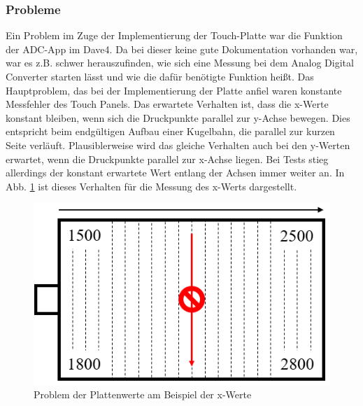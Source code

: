 \documentclass[12pt,a4paper,bibliography=totoc,listof=totoc]{scrartcl}
\begin{document}
\subsubsection{Probleme} \label{subsec:ProblemePlatte}
Ein Problem im Zuge der Implementierung der Touch-Platte war die Funktion der ADC-App im Dave4. Da bei dieser keine gute Dokumentation vorhanden war, war es z.B. schwer herauszufinden, wie sich eine Messung bei dem Analog Digital Converter starten lässt und wie die dafür benötigte Funktion heißt. \newline
Das Hauptproblem, das bei der Implementierung der Platte anfiel waren konstante Messfehler des Touch Panels. Das erwartete Verhalten ist, dass die x-Werte konstant bleiben, wenn sich die Druckpunkte parallel zur y-Achse bewegen. Dies entspricht beim endgültigen Aufbau einer Kugelbahn, die parallel zur kurzen Seite verläuft. Plausiblerweise wird das gleiche Verhalten auch bei den y-Werten erwartet, wenn die Druckpunkte parallel zur x-Achse liegen.
Bei Tests stieg allerdings der konstant erwartete Wert entlang der Achsen immer weiter an. In Abb. \ref{fig:ProblemPlattenwerte} ist dieses Verhalten für die Messung des x-Werts dargestellt.
\begin{figure}[htbp]
	\centering
	\includegraphics[scale = 0.5]{pics/ProblemPlattenwerte}
	\caption{Problem der Plattenwerte am Beispiel der x-Werte}
	\label{fig:ProblemPlattenwerte}
\end{figure}
\end{document}
